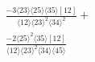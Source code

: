 \documentclass[varwidth, border=5pt]{standalone}
\begin{document}
\begin{my}
$\begin{gathered}
\scriptscriptstyle\frac{-3⟨23⟩⟨25⟩⟨35⟩[12]}{⟨12⟩⟨23⟩^2⟨34⟩^2}+\\
\scriptscriptstyle\frac{-2⟨25⟩^2⟨35⟩[12]}{⟨12⟩⟨23⟩^2⟨34⟩⟨45⟩}\phantom{+}
\end{gathered}$
\end{my}
\end{document}
